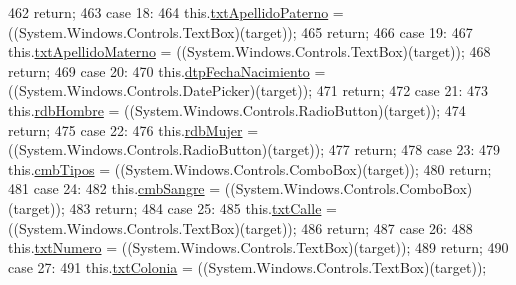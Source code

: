 \begin{DoxyCode}
462             \textcolor{keywordflow}{return};
463             \textcolor{keywordflow}{case} 18:
464             this.\hyperlink{class_proyecto___integrador__3_1_1_main_window_a84bcf28ad1df8514c1b1646ab9a62513}{txtApellidoPaterno} = ((System.Windows.Controls.TextBox)(target));
465             \textcolor{keywordflow}{return};
466             \textcolor{keywordflow}{case} 19:
467             this.\hyperlink{class_proyecto___integrador__3_1_1_main_window_ad6d2f2927d00f63954e85d4609c9c2b6}{txtApellidoMaterno} = ((System.Windows.Controls.TextBox)(target));
468             \textcolor{keywordflow}{return};
469             \textcolor{keywordflow}{case} 20:
470             this.\hyperlink{class_proyecto___integrador__3_1_1_main_window_a366d1c04863cd090fb2a941de8adbd3d}{dtpFechaNacimiento} = ((System.Windows.Controls.DatePicker)(target));
471             \textcolor{keywordflow}{return};
472             \textcolor{keywordflow}{case} 21:
473             this.\hyperlink{class_proyecto___integrador__3_1_1_main_window_a18bdb73ede87b12a96e18de224a8d780}{rdbHombre} = ((System.Windows.Controls.RadioButton)(target));
474             \textcolor{keywordflow}{return};
475             \textcolor{keywordflow}{case} 22:
476             this.\hyperlink{class_proyecto___integrador__3_1_1_main_window_ad63d95f7d01cf55567a764c385df5542}{rdbMujer} = ((System.Windows.Controls.RadioButton)(target));
477             \textcolor{keywordflow}{return};
478             \textcolor{keywordflow}{case} 23:
479             this.\hyperlink{class_proyecto___integrador__3_1_1_main_window_a6ffda9fa41aae566606ef782be37ed11}{cmbTipos} = ((System.Windows.Controls.ComboBox)(target));
480             \textcolor{keywordflow}{return};
481             \textcolor{keywordflow}{case} 24:
482             this.\hyperlink{class_proyecto___integrador__3_1_1_main_window_a78f29679759491825a6a30ad89e8a867}{cmbSangre} = ((System.Windows.Controls.ComboBox)(target));
483             \textcolor{keywordflow}{return};
484             \textcolor{keywordflow}{case} 25:
485             this.\hyperlink{class_proyecto___integrador__3_1_1_main_window_afbbf986bc8047e3cade1e2ab50a1402c}{txtCalle} = ((System.Windows.Controls.TextBox)(target));
486             \textcolor{keywordflow}{return};
487             \textcolor{keywordflow}{case} 26:
488             this.\hyperlink{class_proyecto___integrador__3_1_1_main_window_aa5f2bae20c9397b7c6ea3926afebd5ce}{txtNumero} = ((System.Windows.Controls.TextBox)(target));
489             \textcolor{keywordflow}{return};
490             \textcolor{keywordflow}{case} 27:
491             this.\hyperlink{class_proyecto___integrador__3_1_1_main_window_a3c03dcfb84d69ba923dcc7d54d98c569}{txtColonia} = ((System.Windows.Controls.TextBox)(target));

\end{DoxyCode}
